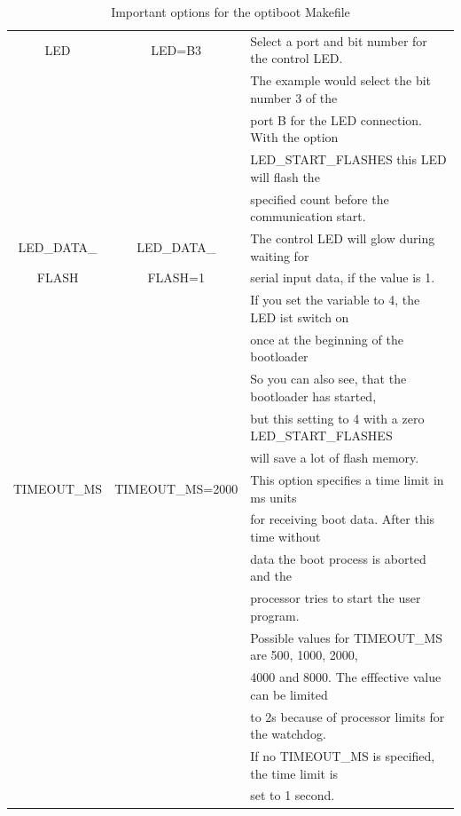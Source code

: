 \begin{table}[H]
\begin{center}
\begin{tabular}{| c | c | l |}
    \hline
 LED               & LED=B3         & Select a port and bit number for the control LED. \\
                   &                & The example would select the bit number 3 of the \\
                   &                & port B for the LED connection. With the option \\
                   &                & LED\_START\_FLASHES  this LED will flash the \\
                   &                & specified count before the communication start. \\
    \hline
 LED\_DATA\_       & LED\_DATA\_    & The control LED will glow during waiting for \\
      FLASH        &    FLASH=1     & serial input data, if the value is 1. \\
	           &                & If you set the variable to 4, the LED ist switch on \\
		   &                & once at the beginning of the bootloader \\
		   &                & So you can also see, that the bootloader has started, \\
		   &                & but this setting to 4 with a zero LED\_START\_FLASHES \\
		   &                & will save a lot of flash memory. \\
    \hline
 TIMEOUT\_MS       & TIMEOUT\_MS=2000 & This option specifies a time limit in ms units \\
                   &                  & for receiving boot data. After this time without \\
                   &                  & data the boot process is aborted and the \\
                   &                  & processor tries to start the user program. \\
                   &                  & Possible values for TIMEOUT\_MS are 500, 1000, 2000, \\
                   &                  & 4000 and 8000. The efffective value can be limited \\
                   &                  & to 2s because of processor limits for the watchdog. \\
                   &                  & If no TIMEOUT\_MS is specified, the time limit is \\
                   &                  & set to 1 second. \\
    \hline
    \end{tabular}
  \end{center}
  \caption{Important options for the optiboot Makefile}
  \label{tab:options1}
\end{table}

